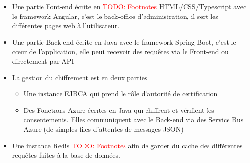 \documentclass[12pt, a4paper]{report}
\makeatletter
\newcommand\TODO[1]{\textcolor{red}{TODO\@: #1}}
\makeatother
\begin{document}
\begin{itemize}
    \item Une partie Font-end écrite en \TODO{Footnotes} HTML/CSS/Typescript avec le framework Angular, c'est le back-office d'administration, il sert les différentes pages web à l'utilisateur.
    \item Une partie Back-end écrite en Java avec le framework Spring Boot, c'est le cœur de l'application, elle peut recevoir des requêtes via le Front-end ou directement par API
    \item La gestion du chiffrement est en deux parties
        \begin{itemize}
            \item Une instance EJBCA qui prend le rôle d'autorité de certification
            \item Des Fonctions Azure écrites en Java qui chiffrent et vérifient les consentements. Elles communiquent avec le Back-end via des Service Bus Azure (de simples files d'attentes de messages JSON)
        \end{itemize}
    \item Une instance Redis \TODO{Footnotes} afin de garder du cache des différentes requêtes faites à la base de données.
\end{itemize}
\end{document}
